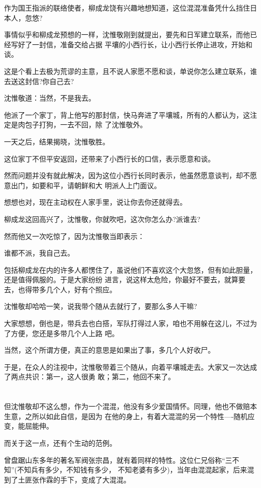 \documentclass[11pt,a4paper,onecolumn]{article}
\begin{document}
作为国王指派的联络使者，柳成龙饶有兴趣地想知道，这位混混准备凭什么挡住日本人，忽悠?

事情似乎和柳成龙预想的一样，沈惟敬刚到就提出，要先和日军建立联系，而他已经写好了一封信，准备交给占据
平壤的小西行长，让小西行长停止进攻，开始和谈。

这是个看上去极为荒谬的主意，且不说人家愿不愿和谈，单说你怎么建立联系，谁去送这封信?你自己去?

沈惟敬道：当然，不是我去。

他派了一个家丁，背上他写的那封信，快马奔进了平壤城，所有的人都认为，这注定是肉包子打狗，一去不回，除
了沈惟敬外。

一天之后，结果揭晓，沈惟敬胜。

这位家丁不但平安返回，还带来了小西行长的口信，表示愿意和谈。

然而问题并没有就此解决，因为这位小西行长同时表示，他虽然愿意谈判，却不愿意出门，如要和平，请朝鲜和大
明派人上门面议。

想想也对，现在主动权在人家手里，说让你去你还就得去。

柳成龙这回高兴了，沈惟敬，你就吹吧，这次你怎么办?派谁去?

然而他又一次吃惊了，因为沈惟敬当即表示：

谁都不派，我自己去。

包括柳成龙在内的许多人都愣住了，虽说他们不喜欢这个大忽悠，但有如此胆量，还是值得佩服的。于是大家纷纷
进言，说这样太危险，你最好不要去，就算要去，也得带多几个人，好有个照应。

沈惟敬却哈哈一笑，说我带个随从去就行了，要那么多人干嘛?

大家想想，倒也是，带兵去也白搭，军队打得过人家，咱也不用躲在这儿，不过为了方便，您还是多带几个人上路
吧。

当然，这个所谓方便，真正的意思是如果出了事，多几个人好收尸。

于是，在众人的注视中，沈惟敬带着三个随从，向着平壤城走去。大家又一次达成了两点共识：第一，这人很勇
敢；第二，他回不来了。

\section[\thesection]{}

但沈惟敬却不这么想，作为一个混混，他没有多少爱国情怀。同理，他也不做赔本生意，之所以如此自信，是因为
在他的身上，有着大混混的另一个特性----随机应变，能屈能伸。

而关于这一点，还有个生动的范例。

曾盘踞山东多年的著名军阀张宗昌，就有着同样的特性。这位仁兄俗称``三不知''(不知兵有多少，不知钱有多少，
不知老婆有多少)，当年由混混起家，后来混到了土匪张作霖的手下，变成了大混混。
\end{document}
